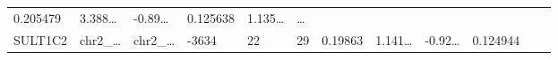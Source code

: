\documentclass[
]{article}
\begin{document}
\begin{longtable}[]{@{}llllllllllll@{}}
\begin{minipage}[t]{0.06\columnwidth}
0.205479\strut
\end{minipage} & \begin{minipage}[t]{0.08\columnwidth}\raggedright
3.388\ldots{}\strut
\end{minipage} & \begin{minipage}[t]{0.06\columnwidth}\raggedright
-0.89\ldots{}\strut
\end{minipage} & \begin{minipage}[t]{0.06\columnwidth}\raggedright
0.125638\strut
\end{minipage} & \begin{minipage}[t]{0.09\columnwidth}\raggedright
1.135\ldots{}\strut
\end{minipage} & \begin{minipage}[t]{0.02\columnwidth}\raggedright
\ldots{}\strut
\end{minipage}\tabularnewline
\begin{minipage}[t]{0.06\columnwidth}\raggedright
SULT1C2\strut
\end{minipage} & \begin{minipage}[t]{0.06\columnwidth}\raggedright
chr2\_\ldots{}\strut
\end{minipage} & \begin{minipage}[t]{0.06\columnwidth}\raggedright
chr2\_\ldots{}\strut
\end{minipage} & \begin{minipage}[t]{0.06\columnwidth}\raggedright
-3634\strut
\end{minipage} & \begin{minipage}[t]{0.06\columnwidth}\raggedright
22\strut
\end{minipage} & \begin{minipage}[t]{0.06\columnwidth}\raggedright
29\strut
\end{minipage} & \begin{minipage}[t]{0.06\columnwidth}\raggedright
0.19863\strut
\end{minipage} & \begin{minipage}[t]{0.08\columnwidth}\raggedright
1.141\ldots{}\strut
\end{minipage} & \begin{minipage}[t]{0.06\columnwidth}\raggedright
-0.92\ldots{}\strut
\end{minipage} & \begin{minipage}[t]{0.06\columnwidth}\raggedright
0.124944\strut
\end{minipage} & \begin{minipage}[t]{0.09\columnwidth}\raggedright

\end{minipage}
\end{longtable}
\end{document}
